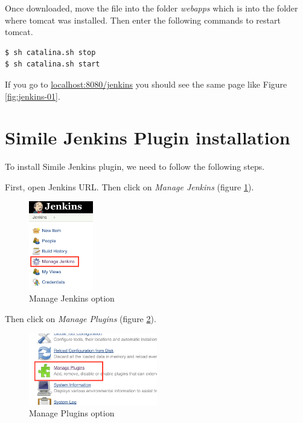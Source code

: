 Once downloaded, move the file into the folder \emph{webapps} which is into the folder where tomcat was installed. Then enter the following commands to restart tomcat.

\begin{verbatim}
$ sh catalina.sh stop
$ sh catalina.sh start
\end{verbatim}

If you go to \url{localhost:8080/jenkins} you should see the same page like Figure \ref{fig:jenkins-01}.

\section{Simile Jenkins Plugin installation}
To install Simile Jenkins plugin, we need to follow the following steps.

First, open Jenkins URL. Then click on \textit{Manage Jenkins} (figure \ref{fig:jenkins-plugin-01}).

\begin{figure}[H]
	\centering
    \includegraphics[width=0.25\textwidth]{grafiken/jenkins-plugin-01}
    \caption{Manage Jenkins option}
    \label{fig:jenkins-plugin-01}
\end{figure}

Then click on \textit{Manage Plugins} (figure \ref{fig:jenkins-plugin-02}).

\begin{figure}[H]
	\centering
    \includegraphics[width=0.5\textwidth]{grafiken/jenkins-plugin-02}
    \caption{Manage Plugins option}
    \label{fig:jenkins-plugin-02}
\end{figure}

